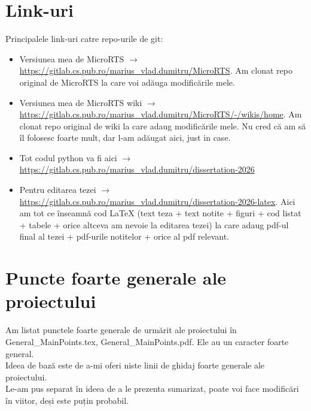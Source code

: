 \documentclass[12pt]{article}
\begin{document}
\section{Link-uri}
    Principalele link-uri catre repo-urile de git:
    \begin{itemize}
        \item Versiunea mea de MicroRTS $\rightarrow$ \url{https://gitlab.cs.pub.ro/marius_vlad.dumitru/MicroRTS}. Am clonat repo original de MicroRTS la care voi adăuga modificările mele.
        \item Versiunea mea de MicroRTS wiki $\rightarrow$ \url{https://gitlab.cs.pub.ro/marius_vlad.dumitru/MicroRTS/-/wikis/home}. Am clonat repo original de wiki la care adaug modificările mele. Nu cred că am să îl folosesc foarte mult, dar l-am adăugat aici, just in case.
        \item Tot codul python va fi aici $\rightarrow$ \url{https://gitlab.cs.pub.ro/marius_vlad.dumitru/dissertation-2026}
        \item Pentru editarea tezei $\rightarrow$ \url{https://gitlab.cs.pub.ro/marius_vlad.dumitru/dissertation-2026-latex}. Aici am tot ce înseamnă cod LaTeX (text teza + text notite + figuri + cod listat + tabele + orice altceva am nevoie la editarea tezei) la care adaug pdf-ul final al tezei + pdf-urile notitelor + orice al pdf relevant.
  \end{itemize}

    \section{Puncte foarte generale ale proiectului}
        Am listat punctele foarte generale de urmărit ale proiectului în General\_MainPoints.tex, General\_MainPoints.pdf. Ele au un caracter foarte general.\\
        Ideea de bază este de a-mi oferi niste linii de ghidaj foarte generale ale proiectului. \\
        Le-am pus separat în ideea de a le prezenta sumarizat, poate voi face modificări în viitor, deși este puțin probabil.
\end{document}
